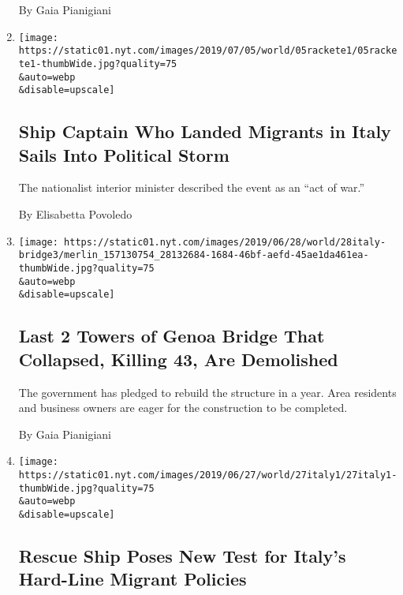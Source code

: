 \begin{enumerate}
  By Gaia Pianigiani
\item
  \href{/2019/07/05/world/europe/carola-rackete-italy-migrants.html}{}

  \texttt{[image: https://static01.nyt.com/images/2019/07/05/world/05rackete1/05rackete1-thumbWide.jpg?quality=75\\\&auto=webp\\\&disable=upscale]}

  \hypertarget{ship-captain-who-landed-migrants-in-italy-sails-into-political-storm}{%
  \subsection{Ship Captain Who Landed Migrants in Italy Sails Into
  Political
  Storm}\label{ship-captain-who-landed-migrants-in-italy-sails-into-political-storm}}

  The nationalist interior minister described the event as an ``act of
  war.''

  By Elisabetta Povoledo
\item
  \href{/2019/06/28/world/europe/genoa-morandi-bridge-collapse.html}{}

  \texttt{[image: https://static01.nyt.com/images/2019/06/28/world/28italy-bridge3/merlin\_157130754\_28132684-1684-46bf-aefd-45ae1da461ea-thumbWide.jpg?quality=75\\\&auto=webp\\\&disable=upscale]}

  \hypertarget{last-2-towers-of-genoa-bridge-that-collapsed-killing-43-are-demolished}{%
  \subsection{Last 2 Towers of Genoa Bridge That Collapsed, Killing 43,
  Are
  Demolished}\label{last-2-towers-of-genoa-bridge-that-collapsed-killing-43-are-demolished}}

  The government has pledged to rebuild the structure in a year. Area
  residents and business owners are eager for the construction to be
  completed.

  By Gaia Pianigiani
\item
  \href{/2019/06/27/world/europe/italy-migrants-sea-watch.html}{}

  \texttt{[image: https://static01.nyt.com/images/2019/06/27/world/27italy1/27italy1-thumbWide.jpg?quality=75\\\&auto=webp\\\&disable=upscale]}

  \hypertarget{rescue-ship-poses-new-test-for-italys-hard-line-migrant-policies}{%
  \subsection{Rescue Ship Poses New Test for Italy's Hard-Line Migrant
  Policies}\label{rescue-ship-poses-new-test-for-italys-hard-line-migrant-policies}}


\end{enumerate}
